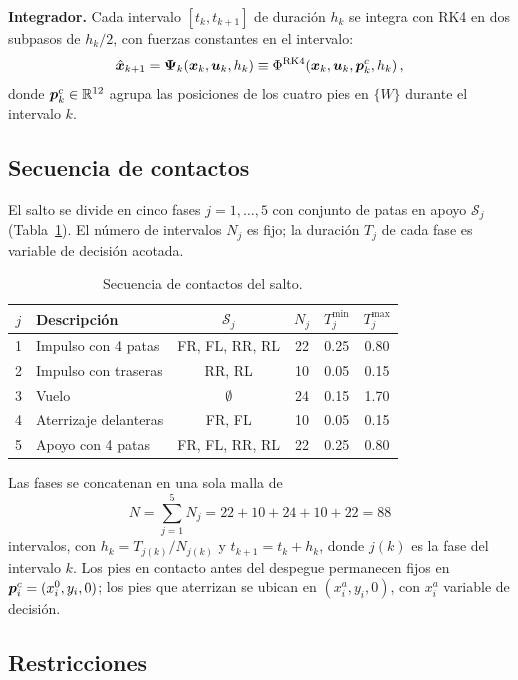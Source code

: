 \textbf{Integrador.} Cada intervalo $[t_k,t_{k+1}]$ de duración $h_k$ se integra con RK4 en dos subpasos de $h_k/2$, con fuerzas constantes en el intervalo:
\begin{equation*}
\hat{\bm{x}}_{k+1}=\bm{\Psi}_k(\bm{x}_k,\bm{u}_k,h_k)\equiv\Phi^{\mathrm{RK4}}\!\left(\bm{x}_k,\bm{u}_k,\bm{p}^c_k,h_k\right),
\end{equation*}
donde $\bm{p}^c_k\in\mathbb{R}^{12}$ agrupa las posiciones de los cuatro pies en $\{W\}$ durante el intervalo $k$.

\subsection{Secuencia de contactos}
El salto se divide en cinco fases $j=1,\dots,5$ con conjunto de patas en apoyo $\mathcal S_j$ (Tabla~\ref{tab:fases}). El número de intervalos $N_j$ es fijo; la duración $T_j$ de cada fase es variable de decisión acotada.

\begin{table}[h]
\caption{Secuencia de contactos del salto.}
\label{tab:fases}
\centering
\begin{tabular}{@{}clcccc@{}}
\toprule
$j$ & Descripción & $\mathcal S_j$ & $N_j$ & $T_j^{\min}$ & $T_j^{\max}$ \\
\midrule
1 & Impulso con 4 patas & FR, FL, RR, RL & 22 & 0.25 & 0.80\\
2 & Impulso con traseras & RR, RL & 10 & 0.05 & 0.15\\
3 & Vuelo & $\emptyset$ & 24 & 0.15 & 1.70\\
4 & Aterrizaje delanteras & FR, FL & 10 & 0.05 & 0.15\\
5 & Apoyo con 4 patas & FR, FL, RR, RL & 22 & 0.25 & 0.80\\
\bottomrule
\end{tabular}
\end{table}

Las fases se concatenan en una sola malla de
\begin{equation*}
N=\sum_{j=1}^{5}N_j=22+10+24+10+22=88
\end{equation*}
intervalos, con $h_k=T_{j(k)}/N_{j(k)}$ y $t_{k+1}=t_k+h_k$, donde $j(k)$ es la fase del intervalo $k$. Los pies en contacto antes del despegue permanecen fijos en $\bm{p}^{c}_i=(x^{0}_i,y_i,0)$; los pies que aterrizan se ubican en $(x^a_i,y_i,0)$, con $x^a_i$ variable de decisión.

\subsection{Restricciones}
